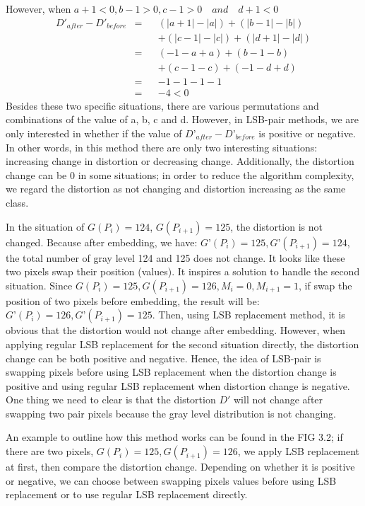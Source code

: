 However, when \(a + 1 < 0, b - 1 > 0, c - 1 > 0 \quad and \quad d + 1 < 0\)
\begin{align*} 
D'_{after} - D'_{before}    &= & & (|a + 1| - |a|) + (|b - 1| - |b|)\\
                            &  & & +(|c - 1| - |c|) + (|d + 1| - |d|)\\
                            &= & & ( - 1 - a + a) + (b - 1 - b)\\
                            &  & & + (c - 1 - c) + ( - 1 - d + d)\\
                            &= & & - 1 - 1 - 1 - 1\\
                            &= & & -4 < 0
\end{align*}
Besides these two specific situations, there are various permutations and combinations of the value of a, b, c and d. However, in LSB-pair methods, we are only interested in whether if the value of $D’_{after} - D’_{before}$ is positive or negative.  In other words, in this method there are only two interesting situations: increasing change in distortion or decreasing change. Additionally, the distortion change can be 0 in some situations; in order to reduce the algorithm complexity, we regard the distortion as not changing and distortion increasing as the same class.

In the situation of \(G(P_{i}) = 124\), \(G(P_{i+1}) = 125\), the distortion is not changed. Because after embedding, we have: \(G’(P_{i}) = 125, G’(P_{i+1}) = 124\), the total number of gray level 124 and 125 does not change. It looks like these two pixels swap their position (values). It inspires a solution to handle the second situation. Since \(G(P_{i}) = 125, G(P_{i+1}) = 126, M_{i} = 0, M_{i+1} = 1\), if swap the position of two pixels before embedding, the result will be: \(G’(P_{i}) = 126, G’(P_{i+1}) = 125\). Then, using LSB replacement method, it is obvious that the distortion would not change after embedding. However, when applying regular LSB replacement for the second situation directly, the distortion change can be both positive and negative. Hence, the idea of LSB-pair is swapping pixels before using LSB replacement when the distortion change is positive and using regular LSB replacement when distortion change is negative. One thing we need to clear is that the distortion \(D'\) will not change after swapping two pair pixels because the gray level distribution is not changing.

An example to outline how this method works can be found in the FIG 3.2; if there are two pixels, \(G(P_{i}) = 125, G(P_{i+1}) = 126\), we apply LSB replacement at first, then compare the distortion change. Depending on whether it is positive or negative, we can choose between swapping pixels values before using LSB replacement or to use regular LSB replacement directly. 


